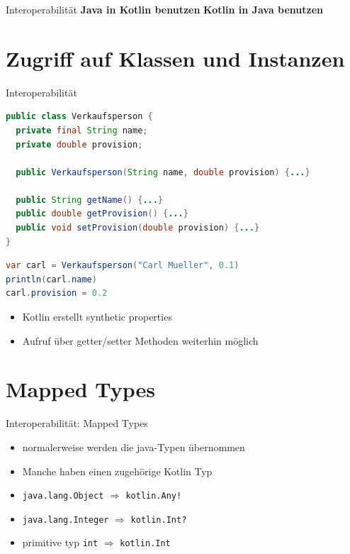 \documentclass{beamer}
\begin{document}
\begin{frame}{Interoperabilität}
  \textbf{Java in Kotlin benutzen}
  \tableofcontents[sections={10-12}]
  \textbf{Kotlin in Java benutzen}
  \tableofcontents[sections={13}]
\end{frame}

\section{Zugriff auf Klassen und Instanzen}

\begin{frame}[fragile]{Interoperabilität}
  \begin{lstlisting}[language=Java]
public class Verkaufsperson {
  private final String name;
  private double provision;

  public Verkaufsperson(String name, double provision) {...}

  public String getName() {...}
  public double getProvision() {...}
  public void setProvision(double provision) {...}
}
  \end{lstlisting}
  \pause
  \begin{lstlisting}[language=Java]
var carl = Verkaufsperson("Carl Mueller", 0.1)
println(carl.name)
carl.provision = 0.2
  \end{lstlisting}
  \pause
  \begin{itemize}
    \item Kotlin erstellt synthetic properties
    \item Aufruf über getter/setter Methoden weiterhin möglich
  \end{itemize}
\end{frame}

\section{Mapped Types}

\begin{frame}[fragile]{Interoperabilität: Mapped Types}
  \begin{itemize}[<+->]
    \item normalerweise werden die java-Typen übernommen
    \item Manche haben einen zugehörige Kotlin Typ
  \end{itemize}
  \pause[\thebeamerpauses] \vspace{0.2cm}
  \begin{itemize}[<+->]
    \item \texttt{java.lang.Object} $\Rightarrow$ \texttt{kotlin.Any!}
    \item \texttt{java.lang.Integer} $\Rightarrow$ \texttt{kotlin.Int?}
    \item primitive typ \texttt{int} $\Rightarrow$ \texttt{kotlin.Int}
  \end{itemize}
\end{frame}
\end{document}
